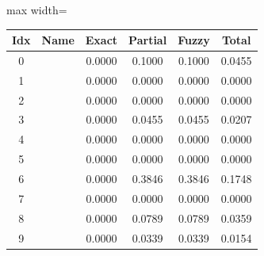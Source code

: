 \begin{table}[h]
\centering
\begin{adjustbox}{max width=\textwidth}
\begin{tabular}{ |c|c|c|c|c|c| }
\hline
Idx & Name & Exact & Partial & Fuzzy & Total \\
\hline
0 &  & 0.0000 & 0.1000 & 0.1000 & 0.0455 \\
\hline
1 &  & 0.0000 & 0.0000 & 0.0000 & 0.0000 \\
\hline
2 &  & 0.0000 & 0.0000 & 0.0000 & 0.0000 \\
\hline
3 &  & 0.0000 & 0.0455 & 0.0455 & 0.0207 \\
\hline
4 &  & 0.0000 & 0.0000 & 0.0000 & 0.0000 \\
\hline
5 &  & 0.0000 & 0.0000 & 0.0000 & 0.0000 \\
\hline
6 &  & 0.0000 & 0.3846 & 0.3846 & 0.1748 \\
\hline
7 &  & 0.0000 & 0.0000 & 0.0000 & 0.0000 \\
\hline
8 &  & 0.0000 & 0.0789 & 0.0789 & 0.0359 \\
\hline
9 &  & 0.0000 & 0.0339 & 0.0339 & 0.0154 \\
\hline
\end{tabular}
\end{adjustbox}
\end{table}
